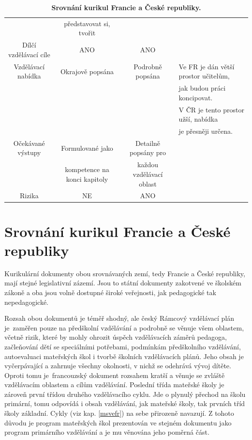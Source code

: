 \begin{landscape}
\begin{table}[t]
\begin{tabular}{|c|c|c|l|}
\rowcolor{grey!10}
					& představovat si, tvořit 	&						& 	\\		
\rowcolor{grey!50}
Dílčí vzdělávací cíle	& ANO					& ANO 					& 	\\	
\rowcolor{grey!10}
Vzdělávací nabídka	& Okrajově popsána	 		& Podrobně popsána	 	& Ve FR je dán větší prostor učitelům, 	\\
\rowcolor{grey!10}
					&							&						& jak budou práci koncipovat. 			\\
\rowcolor{grey!10}
					&							&						& V ČR je tento prostor užší, nabídka 	\\
\rowcolor{grey!10}
					&							&						& je přesněji určena. 					\\
\rowcolor{grey!50}
Očekávané výstupy	& Formulované jako 				& Detailně popsány pro 		& 		\\ 
\rowcolor{grey!50}
					& kompetence na konci kapitoly 	& každou vzdělávací oblast 	& 		\\
\rowcolor{grey!10}
Rizika	 			& NE						& ANO	 						& 		\\
\hline
\end{tabular}
\caption{ \textbf{Srovnání kurikul Francie a České republiky.}
}
\label{tab:srovnaniKurikul}
\end{table}
\end{landscape}

\section{Srovnání kurikul Francie a České republiky}
\label{srovnanikurikulfrcr}

	Kurikulární dokumenty obou srovnávaných zemí, tedy Francie a České republiky, mají stejné legislativní zázemí. Jsou to státní dokumenty zakotvené ve školském zákoně a oba jsou volně dostupné široké veřejnosti, jak pedagogické tak nepedagogické. 

	Rozsah obou dokumentů je téměř shodný, ale český Rámcový vzdělávací plán je zaměřen pouze na předškolní vzdělávání a podrobně se věnuje všem oblastem, včetně rizik, které by mohly ohrozit úspěch vzdělávacích záměrů pedagoga, začleňování dětí se speciálními potřebami, podmínkám předškolního vzdělávání, autoevaluaci mateřských škol i tvorbě školních vzdělávacích plánů. Jeho obsah je vyčerpávající a zahrnuje všechny okolnosti, v nichž se odehrává vývoj dítěte. Oproti tomu je francouzský dokument rozsahem kratší a věnuje se zvláště vzdělávacím oblastem a cílům vzdělávání. Poslední třída mateřské školy je zároveň první třídou druhého vzdělávacího cyklu. Jde o plynulý přechod na školu primární, tomu odpovídá i obsah vzdělávání, jak mateřské školy, tak prvních tříd školy základní. Cykly (viz kap. \ref{msvefr}) na sebe přirozeně navazují. Z tohoto důvodu je program mateřských škol prezentován ve stejném dokumentu jako program primárního vzdělávání a je mu věnována jeho poměrná část.

